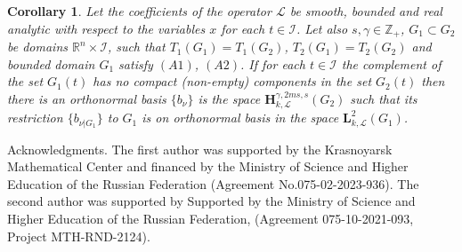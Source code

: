\documentclass{amsart}
\newtheorem{cor}[thm]{Corollary}
\theoremstyle{definition}
\theoremstyle{remark}
\numberwithin{equation}{section}
\begin{document}
\begin{cor} \label{c.bdo.s} 
Let the coefficients of the operator $\mathcal L$ be smooth, bounded and real analytic with 
respect to the variables $x$ for each $t\in \mathcal{I}$. Let also $s,\gamma\in 
{\mathbb Z}_+$,  $G_1 \subset G_2 $ be domains ${\mathbb R}^{n}
\times \mathcal{I}$, such that $T_1 (G_1)= T_1 (G_2)$, $T_2 (G_1) = T_2 (G_2)$ and 
 bounded  domain $G_1$ satisfy $(A1)$, $(A2)$.  If for each $t \in \mathcal{I}$ the complement of the set  
$G_1 (t) $ has no compact (non-empty) components in the set $G_2 (t)$ then there is an 
orthonormal basis $\{ b_\nu\}$ is the space $\mathbf{H}^{\gamma,2ms,s}_{k,\mathcal L} (G_2)$ 
such that its restriction $\{ b_{\nu|G_1}\}$ to $G_1$ is on orthonormal basis in the space  
$\mathbf{L}^{2} _{k,\mathcal L} (G_1)$. 
\end{cor} 

\bigskip

{\sc Acknowledgments.}
The first author was supported 
by the Krasnoyarsk Mathematical Center and financed by the Ministry of Science and Higher 
Education of the Russian Federation (Agreement No.075-02-2023-936). The 
second author was supported by Supported by the Ministry of Science and Higher Education of 
the Russian Federation, (Agreement 075-10-2021-093, Project MTH-RND-2124).
 
\end{document}
